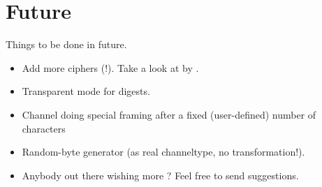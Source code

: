 \documentclass {report}
\begin{document}
\chapter {Future}

Things to be done in future.

\begin {itemize}

\item	Add more ciphers (\PGP!). Take a look at \pgplib{} by
	\tage{}.

\item	Transparent mode for digests.

\item	Channel doing special framing after a fixed (user-defined)
	number of characters

\item	Random-byte generator (as real channeltype, no
	transformation!).


\item	Anybody out there wishing more ? Feel free to send \me{}
	suggestions.
\end   {itemize}


\printindex
\end{document}
